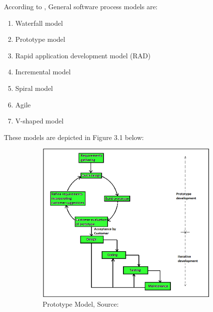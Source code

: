 According to \citet{Sharma:2015}, General software process models are:
\begin{enumerate}
	\item  Waterfall model
	\item  Prototype model
	\item  Rapid application development model (RAD)
	\item  Incremental model
	\item  Spiral model
	\item  Agile
	\item  V-shaped model
\end{enumerate}

These models are depicted in Figure 3.1 below:
\begin{figure}[htbp]
	\centering
	\hfill
	\begin{subfigure}[b]{0.45\textwidth}
		\centering
		\includegraphics[width=\textwidth]{./Prototyping-model}
		\caption{Prototype Model, Source: \citet{Kumar:2020}}
		\label{fig: 1}
	\end{subfigure}
	\hfill
	\begin{subfigure}[b]{0.45\textwidth}
		\centering

\end{subfigure}
\end{figure}
